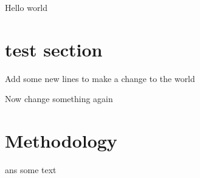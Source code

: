 \documentclass{article}
\begin{document}
	Hello world
	
	\section{test section}
	
	Add some new lines to make a change to the world

Now change something again
\section{Methodology}

ans some text
\end{document}
